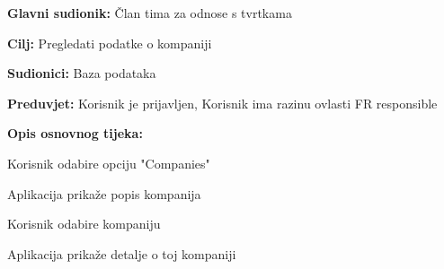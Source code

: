 					\noindent {}
					\begin{packed_item}

						\item \textbf{Glavni sudionik:} Član tima za odnose s tvrtkama
						\item \textbf{Cilj:} Pregledati podatke o kompaniji
						\item \textbf{Sudionici:} Baza podataka
						\item \textbf{Preduvjet:} Korisnik je prijavljen, Korisnik ima razinu ovlasti FR responsible
						\item \textbf{Opis osnovnog tijeka:}

						\item[] \begin{packed_enum}

							\item Korisnik odabire opciju "Companies"
							\item Aplikacija prikaže popis kompanija
							\item Korisnik odabire kompaniju
							\item Aplikacija prikaže detalje o toj kompaniji
						\end{packed_enum}
					\end{packed_item}

